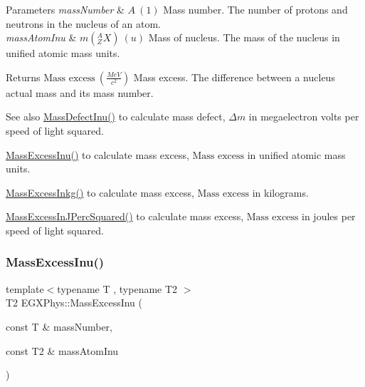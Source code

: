 \begin{DoxyParams}{Parameters}
{\em mass\+Number} & $A\ (1)$ Mass number. The number of protons and neutrons in the nucleus of an atom. \\
\hline
{\em mass\+Atom\+Inu} & $m({^A_ZX})\ (u)$ Mass of nucleus. The mass of the nucleus in unified atomic mass units. \\
\hline
\end{DoxyParams}
\begin{DoxyReturn}{Returns}
$\text{Mass excess}\ (\frac{MeV}{c^2})$ Mass excess. The difference between a nucleus actual mass and its mass number. 
\end{DoxyReturn}
\begin{DoxySeeAlso}{See also}
\mbox{\hyperlink{group___e_g_x_phys-_mass_defect_ga70400004a5cb622de372ab84670731ef}{Mass\+Defect\+Inu()}} to calculate mass defect, $\Delta m$ in megaelectron volts per speed of light squared. 

\mbox{\hyperlink{group___e_g_x_phys-_mass_excess_ga61c6f557bd742126c0c76e88cf7740ad}{Mass\+Excess\+Inu()}} to calculate mass excess, $\text{Mass excess}$ in unified atomic mass units. 

\mbox{\hyperlink{group___e_g_x_phys-_mass_excess_gab72a3640886092be8b9c9662020a2306}{Mass\+Excess\+Inkg()}} to calculate mass excess, $\text{Mass excess}$ in kilograms. 

\mbox{\hyperlink{group___e_g_x_phys-_mass_excess_ga3eb487f438543e950b9c5aece4c5b409}{Mass\+Excess\+In\+J\+Perc\+Squared()}} to calculate mass excess, $\text{Mass excess}$ in joules per speed of light squared. 
\end{DoxySeeAlso}
\mbox{\label{group___e_g_x_phys-_mass_excess_ga61c6f557bd742126c0c76e88cf7740ad}} 
\subsubsection{\texorpdfstring{Mass\+Excess\+Inu()}{MassExcessInu()}}
{\footnotesize\ttfamily template$<$typename T , typename T2 $>$ \\
T2 E\+G\+X\+Phys\+::\+Mass\+Excess\+Inu (\begin{DoxyParamCaption}\item[{const T \&}]{mass\+Number,  }\item[{const T2 \&}]{mass\+Atom\+Inu }\end{DoxyParamCaption})}



